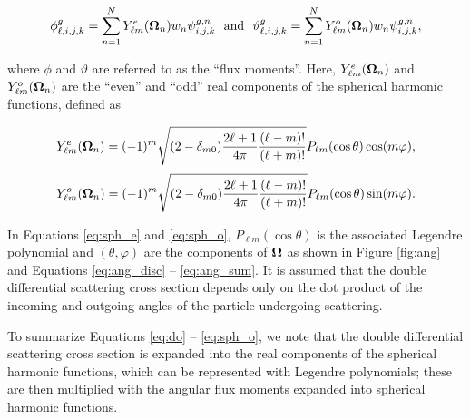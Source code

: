 \begin{equation}
\phi_{\ell,i,j,k}^{g}=\sum_{n=1}^N Y^e_{\ell m}(\mathbf\Omega_n)w_n\psi^{g,n}_{i,j,k}\ \text{ and }\
\vartheta_{\ell,i,j,k}^{g} = \sum_{n=1}^N Y^o_{\ell m}(\mathbf\Omega_n)w_n\psi^{g,n}_{i,j,k},
\label{sph_harm_exp}
\end{equation}

\noindent where $\phi$ and $\vartheta$ are
referred to as the ``flux moments''. 
Here, $Y^e_{\ell m}(\mathbf\Omega_n)$ and $Y^o_{\ell m}(\mathbf\Omega_n)$ are the ``even'' and ``odd'' 
real components of the spherical harmonic functions, defined as \cite{exmm}

\begin{equation}
Y^e_{\ell m}(\mathbf\Omega_n) = (-1)^m\sqrt{(2-\delta_{m0})\frac{2\ell+1}{4\pi}
                       \frac{(\ell-m)!}{(\ell+m)!}}
                       P_{\ell m}(\cos\theta)\cos(m\varphi),
\label{eq:sph_e}
\end{equation}
\begin{equation}
Y^o_{\ell m}(\mathbf\Omega_n) = (-1)^m\sqrt{(2-\delta_{m0})\frac{2\ell+1}{4\pi}
                       \frac{(\ell-m)!}{(\ell+m)!}}
                       P_{\ell m}(\cos\theta)\sin(m\varphi).
\label{eq:sph_o}
\end{equation}

\noindent In Equations \ref{eq:sph_e} and \ref{eq:sph_o}, $P_{\ell m}(\cos\theta)$ is 
the associated Legendre polynomial and $(\theta,\varphi)$ are the components of $\mathbf\Omega$ 
as shown in Figure \ref{fig:ang} and Equations \ref{eq:ang_disc} -- \ref{eq:ang_sum}. It is
assumed that the double differential scattering cross section depends only on the dot product of
the incoming and outgoing angles of the particle undergoing scattering.

To summarize Equations 
\ref{eq:do} -- \ref{eq:sph_o}, we note that the double differential scattering cross section is
expanded into the real components of the spherical harmonic functions, which can be represented
with Legendre polynomials; these are then multiplied with the angular flux moments expanded into
spherical harmonic functions.

